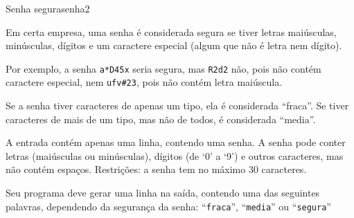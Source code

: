 \documentclass[12pt,a4paper,oneside]{article}
\begin{document}
\begin{problem}{Senha segura}{senha}{2}
 
Em certa empresa, uma senha é considerada segura se tiver letras maiúsculas, minúsculas, dígitos e um caractere especial (algum que não é letra nem dígito).

Por exemplo, a senha \texttt{a*D45x} seria segura, mas \texttt{R2d2} não, pois não contém caractere especial, nem \texttt{ufv\#23}, pois não contém letra maiúscula.

Se a senha tiver caracteres de apenas um tipo, ela é considerada ``fraca''. Se tiver caracteres de mais de um tipo, mas não de todos, é considerada ``media''.

%

\InputFile

A entrada contém apenas uma linha, contendo uma senha. A senha pode conter letras (maiúsculas ou minúsculas), dígitos (de `0' a `9') e outros caracteres, mas não contém espaços. Restrições: a senha tem no máximo 30 caracteres.

\OutputFile

Seu programa deve gerar uma linha na saída, contendo uma das seguintes palavras, dependendo da segurança da senha: ``\texttt{fraca}'', ``\texttt{media}'' ou ``\texttt{segura}''

\Example

\begin{example}
%
\end{example}

\begin{example}
%
\end{example}

\begin{example}
%
\end{example}

\begin{example}
%
\end{example}

\begin{example}
%
\end{example}


\end{problem}
\end{document}

